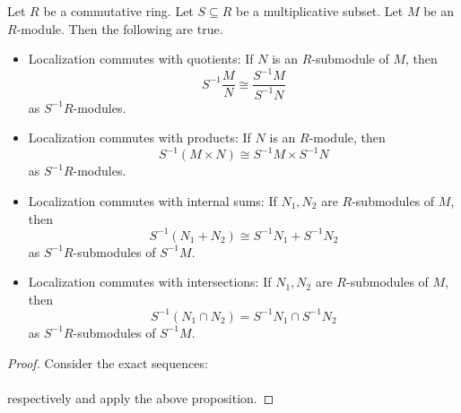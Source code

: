 \documentclass[a4paper]{article}
\begin{document}
\begin{crl}{}{} Let $R$ be a commutative ring. Let $S\subseteq R$ be a multiplicative subset. Let $M$ be an $R$-module. Then the following are true. 
\begin{itemize}
\item Localization commutes with quotients: If $N$ is an $R$-submodule of $M$, then $$S^{-1}\frac{M}{N}\cong\frac{S^{-1}M}{S^{-1}N}$$ as $S^{-1}R$-modules. 
\item Localization commutes with products: If $N$ is an $R$-module, then $$S^{-1}(M\times N)\cong S^{-1}M\times S^{-1}N$$ as $S^{-1}R$-modules. 
\item Localization commutes with internal sums: If $N_1,N_2$ are $R$-submodules of $M$, then $$S^{-1}(N_1+N_2)\cong S^{-1}N_1+S^{-1}N_2$$ as $S^{-1}R$-submodules of $S^{-1}M$. 
\item Localization commutes with intersections: If $N_1,N_2$ are $R$-submodules of $M$, then $$S^{-1}(N_1\cap N_2)=S^{-1}N_1\cap S^{-1}N_2$$ as $S^{-1}R$-submodules of $S^{-1}M$. 
\end{itemize} 
\begin{proof}
Consider the exact sequences: \\
\\
respectively and apply the above proposition. 
\end{proof}
\end{crl}
\end{document}
